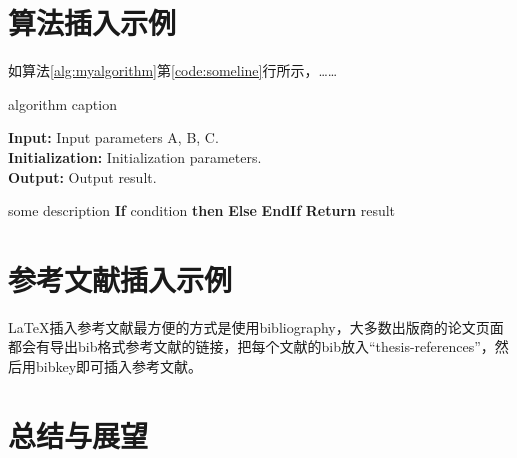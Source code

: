 \newpage

\section{算法插入示例}

如算法\ref{alg:myalgorithm}第\ref{code:someline}行所示，……
\begin{algorithm}
\caption{algorithm caption} %
\hspace*{0.02in} \textbf{Input:} Input parameters A, B, C.\\
\hspace*{0.02in} \textbf{Initialization:} Initialization parameters.\\
\hspace*{0.02in} \textbf{Output:} Output result.
\begin{algorithmic}[1]
	\State some description %
	\State \textbf{If} {condition} \textbf{then}
	\label{code:someline}  
	 	\State {}
	\State \textbf{Else}
	 	\State {}
	 	\State {}
	\State \textbf{EndIf}
	\State \textbf{Return} {result}
\end{algorithmic}
\label{alg:myalgorithm}
\end{algorithm}

\newpage

\section{参考文献插入示例}

LaTeX\cite{lamport1994latex}插入参考文献最方便的方式是使用bibliography\cite{pritchard1969statistical}，大多数出版商的论文页面都会有导出bib格式参考文献的链接，把每个文献的bib放入``thesis-references''，然后用bibkey即可插入参考文献。

\lipsum

\newpage


\section{总结与展望}

